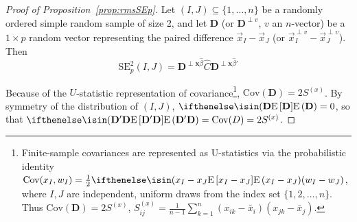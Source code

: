 \documentclass{article}
\theoremstyle{remark}
\begin{document}
\begin{proof}[Proof of Proposition~\ref{prop:rmsSEp}]

Let $(I, J) \subseteq \{1, \ldots, n\}$ be a 
randomly ordered simple random sample of size 2, and let $\mathbf{D}$ (or $\mathbf{D}^{\perp v}$, $v$ an $n$-vector) be a  $1 \times p$ random vector representing the paired difference $\vec{x}_{I} - \vec{x}_{J}$  (or $\vec{x}_{I}^{\perp v} - \vec{x}_{J}^{\perp v}$).  Then
\begin{equation}
  \label{eq:15}
\mathrm{SE}_{p}^{2}(I,J) = \mathbf{D}^{\perp \mathbf{x}\hat\beta}\hat{C} \mathbf{D}^{\perp \mathbf{x}\hat\beta \prime}
\end{equation}

Because of the $U$-statistic representation of covariance\footnote{%
Finite-sample covariances are represented as U-statistics via the probabilistic identity $\mathrm{Cov}(x_{I}, w_{I}) = \frac{1}{2} \E{x_{I} - x_{J}}(w_{I} - w_{J})$, where $I, J$ are independent, uniform draws from the index set $\{1, 2, \ldots, n\}$. Thus
$\mathrm{Cov}(\mathbf{D}) = 2S^{(x)}$,   $S^{(x)}_{ij} = 
\frac{1}{n-1}\sum_{k=1}^{n}(x_{ik} - \bar{x}_{i})(x_{jk} - \bar{x}_{j})$.
}, $\mathrm{Cov} (\mathbf{D}) = 2 S^{(x)}$. By symmetry of the distribution of $(I,J)$,  $\E{\mathbf{D}} 
=0 $, so that $\E{\mathbf{D}'\mathbf{D}} = \mathrm{Cov}(D) = 2S^{(x)}$.  


\end{proof}
\end{document}
